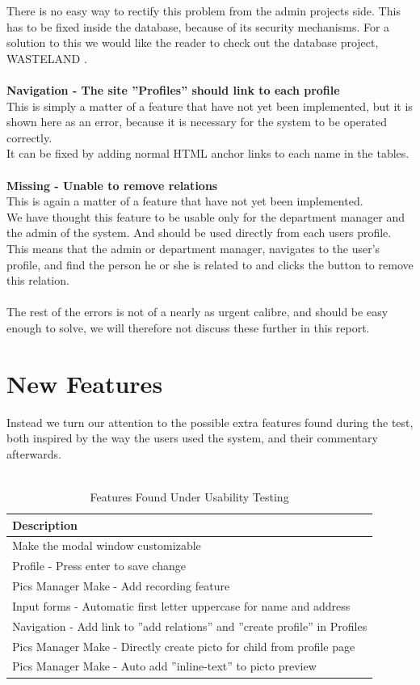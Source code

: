 There is no easy way to rectify this problem from the admin projects side. This has to be fixed inside the database, because of its security mechanisms. For a solution to this we would like the reader to check out the database project, WASTELAND \citep{wasteland}.\\
\\
\textbf{Navigation - The site ''Profiles'' should link to each profile}\\
This is simply a matter of a feature that have not yet been implemented, but it is shown here as an error, because it is necessary for the system to be operated correctly.\\
It can be fixed by adding normal HTML anchor links to each name in the tables.\\
\\
\textbf{Missing - Unable to remove relations}\\
This is again a matter of a feature that have not yet been implemented.\\
We have thought this feature to be usable only for the department manager and the admin of the system. And should be used directly from each users profile. This means that the admin or department manager, navigates to the user's profile, and find the person he or she is related to and clicks the button to remove this relation.\\
\\
The rest of the errors is not of a nearly as urgent calibre, and should be easy enough to solve, we will therefore not discuss these further in this report.\\

\section{New Features}
Instead we turn our attention to the possible extra features found during the test, both inspired by the way the users used the system, and their commentary afterwards.\\
\\

\begin{table}[htbp]
	\centering
		\begin{tabular}{|l|}
			\hline
			Description\\\hline\hline
			Make the modal window customizable \\\hline
			Profile - Press enter to save change \\\hline
			Pics Manager Make - Add recording feature\\\hline
			Input forms - Automatic first letter uppercase for name and address\\\hline  
			Navigation - Add link to ''add relations'' and ''create profile'' in Profiles \\\hline  
			Pics Manager Make - Directly create picto for child from profile page \\\hline
			Pics Manager Make - Auto add ''inline-text'' to picto preview \\\hline
		\end{tabular}
	\caption{Features Found Under Usability Testing}
	\label{tab:NewFeature}
\end{table}	

